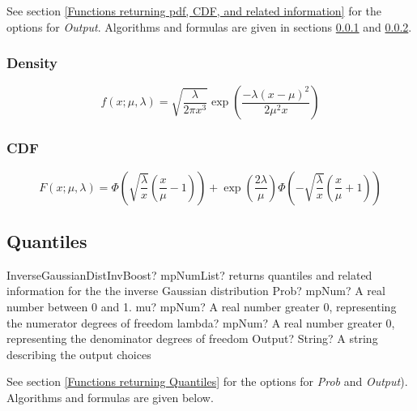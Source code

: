 \vspace{0.3cm}
See section \ref{Functions returning pdf, CDF, and related information} for the options for {\itshape\sffamily Output}. Algorithms and formulas are given in sections \ref{InverseGaussianDistributionDensity} and \ref{InverseGaussianDistributionCDF}.



\subsubsection{Density}
\label{InverseGaussianDistributionDensity}

\begin{equation} 
	f(x;\mu,\lambda)= \sqrt{\frac{\lambda}{2\pi x^3}} \exp \left( \frac{-\lambda(x-\mu)^2}{2\mu^2 x} \right)
\end{equation}


\subsubsection{CDF}
\label{InverseGaussianDistributionCDF}

\begin{equation} 
	F(x;\mu,\lambda)= \Phi\left(\sqrt{\frac{\lambda}{x}} \left(\frac{x}{\mu}-1\right)\right) +\exp \left( \frac{2\lambda}{\mu} \right) \Phi\left(-\sqrt{\frac{\lambda}{x}} \left(\frac{x}{\mu}+1\right)\right)
\end{equation}



\subsection{Quantiles}

\begin{mpFunctionsExtract}
	\mpFunctionFour
	{InverseGaussianDistInvBoost? mpNumList? returns quantiles and related information for the the inverse Gaussian distribution}
	{Prob? mpNum? A real number between 0 and 1.}
	{mu? mpNum? A real number greater 0, representing the numerator  degrees of freedom}
	{lambda? mpNum? A real number greater 0, representing the denominator degrees of freedom}
	{Output? String? A string describing the output choices}
\end{mpFunctionsExtract}

See section \ref{Functions returning Quantiles} for the options for  {\itshape\sffamily Prob} and {\itshape\sffamily Output}). Algorithms and formulas are given below.

